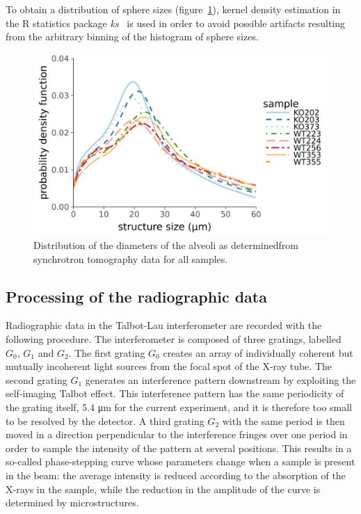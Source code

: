 \documentclass[preprint,12pt]{elsarticle}
\begin{document}
To obtain a distribution of sphere sizes (figure~\ref{243343}), kernel density estimation in the R
statistics package \emph{ks}~\cite{Duong_2007} is used in order to avoid possible artifacts
resulting from the arbitrary binning of the histogram of sphere sizes.
\begin{figure}[h!]
\begin{center}
\includegraphics[width=0.70\columnwidth]{figures/size_pdf/size_pdf}
\caption{{Distribution of the diameters of the alveoli as determinedfrom
synchrotron tomography data for all samples.
{\label{243343}}%
}}
\end{center}
\end{figure}


\subsection*{Processing of the radiographic data}\label{sec:radioprocessing}
Radiographic data in the Talbot-Lau interferometer are recorded with the
following procedure. The interferometer is composed of three gratings,
labelled $G_0$, $G_1$ and $G_2$. The first grating $G_0$ creates an array of
individually coherent but mutually incoherent light sources from the
focal spot of the X-ray tube. The second grating $G_1$ generates an
interference pattern downstream by exploiting the self-imaging Talbot
effect. This interference pattern has the same periodicity of the grating
itself, 5.4 μm for the current experiment, and it is therefore too small to
be resolved by the detector. A third grating $G_2$ with the same period is
then moved in a direction perpendicular to the interference fringes over one
period in order to sample the intensity of the pattern at several positions.
This results in a so-called phase-stepping curve whose parameters change
when a sample is present in the beam: the average intensity is reduced
according to the absorption of the X-rays in the sample, while the reduction
in the amplitude of the curve is determined by microstructures.
\end{document}
